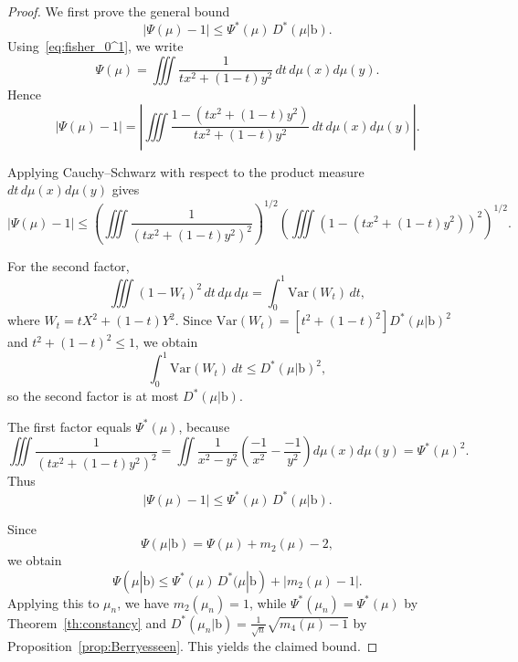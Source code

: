 \documentclass[10pt,a4paper]{amsart}
\begin{document}
\begin{proof}
We first prove the general bound
\[
|\Psi(\mu)-1|
\le \Psi^*(\mu)\,D^*(\mu|\mathbb{\mathrm b}).
\]
Using~\eqref{eq:fisher_0^1}, we write
\[
\Psi(\mu)
=\iiint \frac{1}{t x^2+(1-t)y^2}\,dt\,d\mu(x)d\mu(y).
\]
Hence
\[
|\Psi(\mu)-1|
=\left|
\iiint 
\frac{1-(t x^2+(1-t)y^2)}{t x^2+(1-t)y^2}
\,dt\,d\mu(x)d\mu(y)
\right|.
\]

Applying Cauchy--Schwarz with respect to the product measure
$dt\,d\mu(x)d\mu(y)$ gives
\[
|\Psi(\mu)-1|
\le
\left(
\iiint \frac{1}{(t x^2+(1-t)y^2)^2}
\right)^{1/2}
\left(
\iiint (1-(t x^2+(1-t)y^2))^2
\right)^{1/2}.
\]

For the second factor,
\[
\iiint(1-W_t)^2\,dt\,d\mu\,d\mu = \int_0^1\mathrm{Var}(W_t)\,dt,
\]
where $W_t=tX^2+(1-t)Y^2$. Since $\mathrm{Var}(W_t)=[t^2+(1-t)^2]D^*(\mu|\mathrm{b})^2$ and $t^2+(1-t)^2\leq 1$, we obtain
\[
\int_0^1\mathrm{Var}(W_t)\,dt \leq D^*(\mu|\mathrm{b})^2,
\]
so the second factor is at most $D^*(\mu|\mathrm{b})$.

The first factor equals $\Psi^*(\mu)$, because
\[
\iiint \frac{1}{(t x^2+(1-t)y^2)^2}
=
\iint \frac{1}{x^2-y^2}\!\left(\frac{-1}{x^2}-\frac{-1}{y^2}\right)
d\mu(x)d\mu(y)
=\Psi^*(\mu)^2.
\]
Thus
\[
|\Psi(\mu)-1|
\le \Psi^*(\mu)\,D^*(\mu|\mathbb{\mathrm b}).
\]

Since
\[
\Psi(\mu|\mathbb{\mathrm b})
=\Psi(\mu)+m_2(\mu)-2,
\]
we obtain
\[
\Psi(\mu|\mathbb{\mathrm b})
\le \Psi^*(\mu)\,D^*(\mu|\mathbb{\mathrm b})
+|m_2(\mu)-1|.
\]
Applying this to $\mu_n$, we have $m_2(\mu_n)=1$, while
$\Psi^*(\mu_n)=\Psi^*(\mu)$ by Theorem~\ref{th:constancy}
and
$D^*(\mu_n|\mathbb{\mathrm b})=\frac{1}{\sqrt n}\sqrt{m_4(\mu)-1}$
by Proposition~\ref{prop:Berryesseen}.
This yields the claimed bound.
\end{proof}
\end{document}
